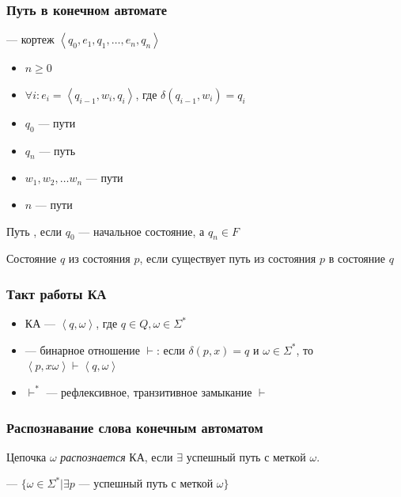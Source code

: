 \documentclass[a4paper, 14pt]{extarticle}
\begin{document}
\subsubsection{Путь в конечном автомате}
 --- кортеж $ \left\langle q_0, e_1, q_1, \ldots, e_n, q_n \right\rangle$
\begin{itemize}
    \item $n \ge 0$
    \item $\forall i: e_i = \left\langle q_{i-1}, w_i, q_i \right\rangle$, где $ \delta(q_{i-1}, w_i) = q_i $
    \item $q_0$ ---  пути
    \item $q_n$ ---  путь
    \item $w_1, w_2, \ldots w_n$ ---  пути
    \item $n$ ---  пути 
\end{itemize}


Путь , если $q_0$ --- начальное состояние, а $q_n \in F$ 

Состояние $q$  из состояния $p$, если существует путь из состояния $p$ в состояние $q$

\subsubsection*{Такт работы КА}
\begin{itemize}
    \item {} КА --- $ \left\langle q, \omega \right\rangle$, где $q \in Q, \omega \in \Sigma^* $
    \item {} --- бинарное отношение $\vdash$: если $ \delta(p, x) = q $ и $ \omega \in \Sigma^* $, то $ \left\langle p, x \omega \right\rangle \vdash \left\langle q, \omega \right\rangle $
    \item $\vdash^*$ --- рефлексивное, транзитивное замыкание $\vdash$
\end{itemize}

\subsubsection*{Распознавание слова конечным автоматом}

Цепочка $\omega$ \textit{распознается} КА, если $\exists$ успешный путь с меткой $ \omega $. 

 --- $ \{ \omega \in \Sigma^* | \exists p \text{ --- успешный путь с меткой } \omega  \} $
\end{document}

